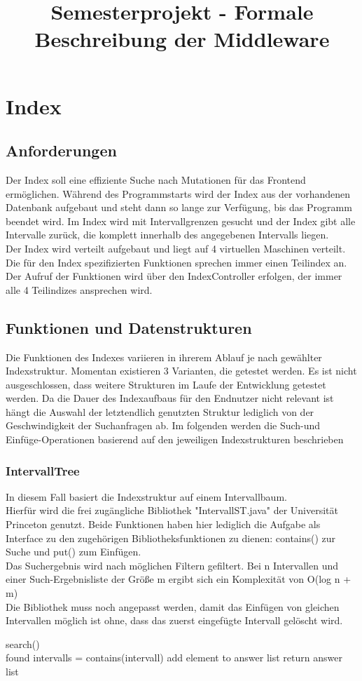 \documentclass[]{article}
\title{Semesterprojekt - Formale Beschreibung der Middleware}
\begin{document}
\maketitle
\section{Index}
\subsection{Anforderungen}
Der Index soll eine effiziente Suche nach Mutationen für das Frontend ermöglichen. Während des Programmstarts wird der Index aus der vorhandenen Datenbank aufgebaut und steht dann so lange zur Verfügung, bis das Programm beendet wird.
Im Index wird mit Intervallgrenzen gesucht und der Index gibt alle Intervalle zurück, die komplett innerhalb des angegebenen Intervalls liegen.\\
Der Index wird verteilt aufgebaut und liegt auf 4 virtuellen Maschinen verteilt. Die für den Index spezifizierten Funktionen sprechen immer einen Teilindex an. Der Aufruf der Funktionen wird über den IndexController erfolgen, der immer alle 4 Teilindizes ansprechen wird.
\subsection{Funktionen und Datenstrukturen}
Die Funktionen des Indexes variieren in ihrerem Ablauf je nach gewählter Indexstruktur. Momentan existieren 3 Varianten, die getestet werden. Es ist nicht ausgeschlossen, dass weitere Strukturen im Laufe der Entwicklung getestet werden. Da die Dauer des Indexaufbaus für den Endnutzer nicht relevant ist hängt die Auswahl der letztendlich genutzten Struktur lediglich von der Geschwindigkeit der Suchanfragen ab.
Im folgenden werden die Such-und Einfüge-Operationen basierend auf den jeweiligen Indexstrukturen beschrieben
\newpage
\subsubsection{IntervallTree}
In diesem Fall basiert die Indexstruktur auf einem Intervallbaum.\\
Hierfür wird die frei zugängliche Bibliothek "IntervallST.java" der Universität Princeton genutzt. Beide Funktionen haben hier lediglich die Aufgabe als Interface zu den zugehörigen Bibliotheksfunktionen zu dienen: contains() zur Suche und put() zum Einfügen.\\
Das Suchergebnis wird nach möglichen Filtern gefiltert. Bei n Intervallen und einer Such-Ergebnisliste der Größe m ergibt sich ein Komplexität von O(log n + m)\\ Die Bibliothek muss noch angepasst werden, damit das Einfügen von gleichen Intervallen möglich ist ohne, dass das zuerst eingefügte Intervall gelöscht wird.
\begin{algorithm}
search()\\{
found intervalls = contains(intervall)\;
{
{
{add element to answer list\;}
}
return answer list\;
}
}
\end{algorithm}
\end{document}
